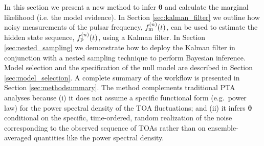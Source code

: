 \documentclass[fleqn,usenatbib,useAMS]{mnras}
\begin{document}
In this section we present a new method to infer $\boldsymbol{\theta}$ and calculate the marginal likelihood (i.e. the model evidence). In Section \ref{sec:kalman_filter} we outline how noisy measurements of the pulsar frequency, $f_{\rm m}^{(n)}(t)$, can be used to estimate the hidden state sequence, $f_{\rm p}^{(n)}(t)$, using a Kalman filter. In Section \ref{sec:nested_sampling} we demonstrate how to deploy the Kalman filter in conjunction with a nested sampling technique to perform Bayesian inference. Model selection and the specification of the null model are described in Section \ref{sec:model_selection}. A complete summary of the workflow is presented in Section \ref{sec:methodsummary}. The method complements traditional PTA analyses because (i) it does not assume a specific functional form (e.g.\ power law) for the power spectral density of the TOA fluctuations; and (ii) it infers ${\boldsymbol{\theta}}$ conditional on the specific, time-ordered, random realization of the noise corresponding to the observed sequence of TOAs rather than on ensemble-averaged quantities like the power spectral density.















%
%
%









\bsp	%
\label{lastpage}
\end{document}
